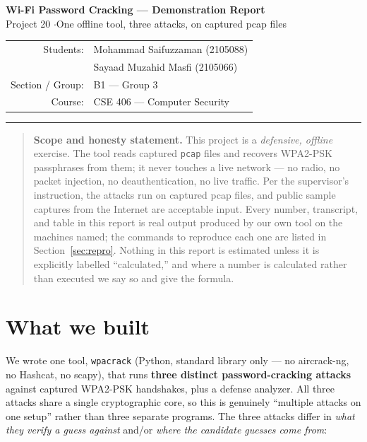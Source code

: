 \documentclass[11pt,a4paper]{article}
\newcommand{\code}[1]{\texttt{#1}}
\begin{document}
\begin{center}
{\LARGE\bfseries Wi-Fi Password Cracking --- Demonstration Report}\\[0.35em]
{\large Project 20 \quad$\cdot$\quad One offline tool, three attacks, on captured pcap files}\\[0.7em]
\begin{tabular}{rl}
Students: & Mohammad Saifuzzaman (2105088) \\
          & Sayaad Muzahid Masfi (2105066) \\
Section / Group: & B1 --- Group 3 \\
Course: & CSE 406 --- Computer Security \\
\end{tabular}
\end{center}

\noindent\rule{\textwidth}{0.4pt}

\begin{quote}
\small\textbf{Scope and honesty statement.} This project is a \emph{defensive, offline}
exercise. The tool reads captured \code{pcap} files and recovers WPA2-PSK passphrases from
them; it never touches a live network --- no radio, no packet injection, no deauthentication,
no live traffic. Per the supervisor's instruction, the attacks run on captured pcap files, and
public sample captures from the Internet are acceptable input. Every number, transcript, and
table in this report is real output produced by our own tool on the machines named; the
commands to reproduce each one are listed in Section~\ref{sec:repro}. Nothing in this report is
estimated unless it is explicitly labelled ``calculated,'' and where a number is calculated
rather than executed we say so and give the formula.
\end{quote}

\section{What we built}

We wrote one tool, \code{wpacrack} (Python, standard library only --- no aircrack-ng, no
Hashcat, no scapy), that runs \textbf{three distinct password-cracking attacks} against
captured WPA2-PSK handshakes, plus a defense analyzer. All three attacks share a single
cryptographic core, so this is genuinely ``multiple attacks on one setup'' rather than three
separate programs. The three attacks differ in \emph{what they verify a guess against} and/or
\emph{where the candidate guesses come from}:
\end{document}
